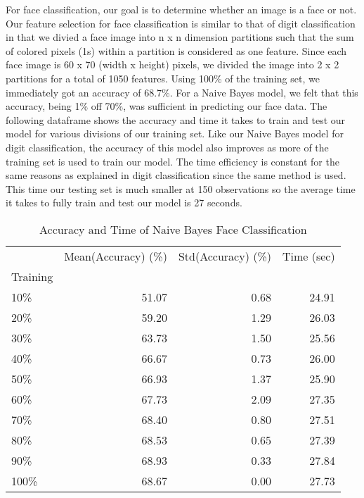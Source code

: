 \documentclass[10pt,parskip=half,
toc=sectionentrywithdots,
bibliography=totocnumbered,
captions=tableheading,numbers=noendperiod]{scrartcl}
\begin{document}
For face classification, our goal is to determine whether an image is a
face or not. Our feature selection for face classification is similar to
that of digit classification in that we divied a face image into n x n
dimension partitions such that the sum of colored pixels (1s) within a
partition is considered as one feature. Since each face image is 60 x 70
(width x height) pixels, we divided the image into 2 x 2 partitions for
a total of 1050 features. Using 100\% of the training set, we
immediately got an accuracy of 68.7\%. For a Naive Bayes model, we felt
that this accuracy, being 1\% off 70\%, was sufficient in predicting our
face data. The following dataframe shows the accuracy and time it takes
to train and test our model for various divisions of our training set.
Like our Naive Bayes model for digit classification, the accuracy of
this model also improves as more of the training set is used to train
our model. The time efficiency is constant for the same reasons as
explained in digit classification since the same method is used. This
time our testing set is much smaller at 150 observations so the average
time it takes to fully train and test our model is 27 seconds.

\begin{table}[H]
\caption{Accuracy and Time of Naive Bayes Face Classification}\label{tbl:tlabel}
\centering
\begin{adjustbox}{max width=\textwidth}
\begin{tabular}{lrrr}
\toprule
{} &  Mean(Accuracy) (\%) &  Std(Accuracy) (\%) &  Time (sec) \\
Training &                     &                    &             \\
\midrule
10\%      &               51.07 &               0.68 &       24.91 \\
20\%      &               59.20 &               1.29 &       26.03 \\
30\%      &               63.73 &               1.50 &       25.56 \\
40\%      &               66.67 &               0.73 &       26.00 \\
50\%      &               66.93 &               1.37 &       25.90 \\
60\%      &               67.73 &               2.09 &       27.35 \\
70\%      &               68.40 &               0.80 &       27.51 \\
80\%      &               68.53 &               0.65 &       27.39 \\
90\%      &               68.93 &               0.33 &       27.84 \\
100\%     &               68.67 &               0.00 &       27.73 \\
\bottomrule
\end{tabular}

\end{adjustbox}
\end{table}
\end{document}

